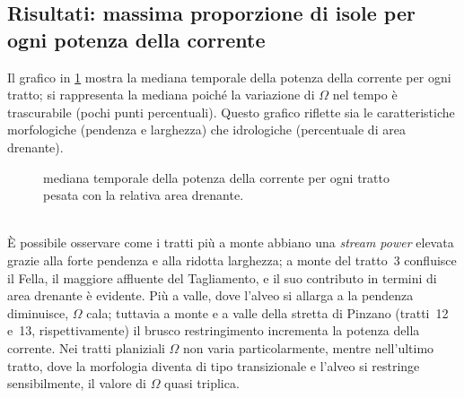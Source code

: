 \subsection{Risultati: massima proporzione di isole per ogni potenza della corrente}
Il grafico in \cref{graph:omega-perc-50} mostra la mediana temporale della potenza della corrente per ogni tratto; si rappresenta la mediana poiché la variazione di $\Omega$ nel tempo è trascurabile (pochi punti percentuali).
Questo grafico riflette sia le caratteristiche morfologiche (pendenza e larghezza) che idrologiche (percentuale di area drenante).
%
\begin{figure}
	\centering
	
	\caption[potenza della corrente in ogni tratto]{mediana temporale della potenza della corrente per ogni tratto pesata con la relativa area drenante.}
	\label{graph:omega-perc-50}
\end{figure}
%
\\
È possibile osservare come i tratti più a monte abbiano una \emph{stream power} elevata grazie alla forte pendenza e alla ridotta larghezza; a monte del tratto~3 confluisce il Fella, il maggiore affluente del Tagliamento, e il suo contributo in termini di area drenante è evidente.
Più a valle, dove l'alveo si allarga a la pendenza diminuisce, $\Omega$ cala; tuttavia a monte e a valle della stretta di Pinzano (tratti~12 e~13, rispettivamente) il brusco restringimento incrementa la potenza della corrente.
Nei tratti planiziali $\Omega$ non varia particolarmente, mentre nell'ultimo tratto, dove la morfologia diventa di tipo transizionale e l'alveo si restringe sensibilmente, il valore di $\Omega$ quasi triplica.

